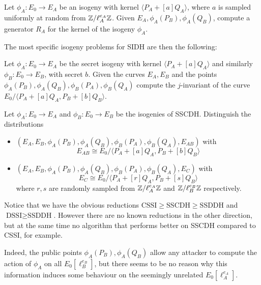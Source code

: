 \begin{problem}
    Let $\phi_A:E_0\to E_A$ be an isogeny with kernel $\langle P_A+[a]Q_A \rangle$, where $a$ is sampled uniformly at random from $\mathbb{Z}/\ell_A^{e_A}\mathbb{Z}$. Given $E_A, \phi_A(P_B),\phi_A(Q_B)$, compute a generator $R_A$ for the kernel of the isogeny $\phi_A$.
\end{problem}

The most specific isogeny problems for SIDH are then the following:

\begin{problem}
    Let $\phi_A:E_0\to E_A$ be the secret isogeny with kernel $\langle P_A+[a]Q_A \rangle$ and similarly $\phi_B:E_0\to E_B$, with secret $b$. Given the curves $E_A,E_B$ and the points $\phi_A(P_B),\phi_A(Q_B),\phi_B(P_A),\phi_B(Q_A)$ compute the $j$-invariant of the curve $E_0/\langle P_A+[a]Q_A,P_B+[b]Q_B \rangle$.
\end{problem}

\begin{problem}
    Let $\phi_A:E_0\to E_A$ and $\phi_B:E_0\to E_B$ be the isogenies of SSCDH. Distinguish the distributions
    \begin{itemize}
        \item $(E_A,E_B,\phi_A(P_B),\phi_A(Q_B),\phi_B(P_A),\phi_B(Q_A), E_{AB})$ with $$E_{AB}\cong E_0/\langle P_A+[a]Q_A,P_B+[b]Q_B \rangle$$
        \item $(E_A,E_B,\phi_A(P_B),\phi_A(Q_B),\phi_B(P_A),\phi_B(Q_A), E_C)$ with $$E_C\cong E_0/\langle P_A+[r]Q_A,P_B+[s]Q_B \rangle$$
        where $r,s$ are randomly sampled from $\mathbb{Z}/\ell_A^{e_A}\mathbb{Z}$ and $\mathbb{Z}/\ell_B^{e_B}\mathbb{Z}$ respectively.
    \end{itemize}
\end{problem}

Notice that we have the obvious reductions $\text{CSSI}\ge\text{SSCDH}\ge\text{SSDDH}$ and $\text{DSSI}\ge\text{SSDDH}$. However there are no known reductions in the other direction, but at the same time no algorithm that performs better on SSCDH compared to CSSI, for example.

Indeed, the public points $\phi_A(P_B),\phi_A(Q_B)$ allow any attacker to compute the action of $\phi_A$ on all $E_0[\ell_B^{e_B}]$, but there seems to be no reason why this information induces some behaviour on the seemingly unrelated $E_0[\ell_A^{e_A}]$.

